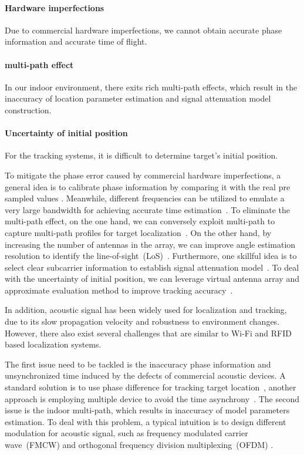 \paragraph*{Hardware imperfections} Due to commercial hardware imperfections, we cannot obtain accurate phase information and accurate time of
flight.

\paragraph*{multi-path effect} In our indoor environment, there exits rich  multi-path effects, which result in the inaccuracy of location
parameter estimation and signal attenuation model construction.

\paragraph*{Uncertainty of initial position} For the tracking systems, it is difficult to determine target's initial position.



 To mitigate the phase error caused by commercial hardware imperfections, a general idea is to calibrate phase information by comparing it
 with the real pre sampled values \cite{Wang2016D}. Meanwhile, different frequencies can be utilized to emulate a very large bandwidth for
 achieving accurate time estimation~\cite{RFind}. To eliminate the multi-path effect, on the one hand, we can conversely exploit multi-path
 to capture multi-path profiles for target localization~\cite{PinIt}. On the other hand, by increasing the number of antennas in the array,
 we can improve angle estimation resolution to identify the line-of-sight~(LoS)~\cite{Arraytrack, Spotfi}. Furthermore, one skillful idea
 is to select clear subcarrier information to establish signal attenuation model~\cite{wang2016lifs}. To deal with the uncertainty of
 initial position, we can leverage virtual antenna array and approximate evaluation method to improve tracking accuracy~\cite{Tagoram}.

In addition, acoustic signal has been widely used for localization and tracking, due to its slow propagation velocity and robustness to
environment changes. However, there also exist several challenges that are similar to Wi-Fi and RFID based localization systems.

The first issue need to be tackled is the inaccuracy phase information and unsynchronized time induced by the defects of commercial
acoustic devices. A standard solution is to use phase difference for tracking target location~\cite{LLAP}, another approach is employing
multiple device to avoid the time asynchrony~\cite{BeepBeep}.  The second issue is the indoor multi-path, which results in inaccuracy of
model parameters estimation. To deal with this problem, a typical intuition is to design different modulation for acoustic signal, such as
frequency modulated carrier wave~(FMCW) and orthogonal frequency division multiplexing~(OFDM) \cite{CAT,STRATA}.
